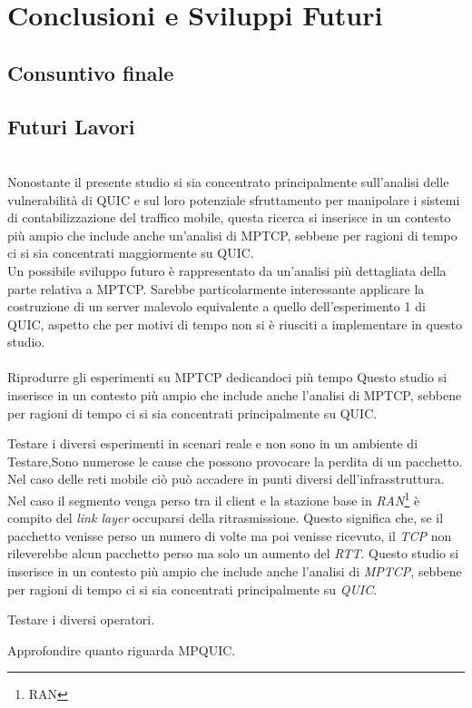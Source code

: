 \chapter{Conclusioni e Sviluppi Futuri}
\label{cap:conclusioni}

\section{Consuntivo finale}

\section{Futuri Lavori}
~\\
\indent Nonostante il presente studio si sia concentrato principalmente sull'analisi delle vulnerabilità di QUIC e sul loro potenziale sfruttamento per manipolare i sistemi di contabilizzazione del traffico mobile, questa ricerca si inserisce in un contesto più ampio che include anche un'analisi di MPTCP, sebbene per ragioni di tempo ci si sia concentrati maggiormente su QUIC.
\\
Un possibile sviluppo futuro è rappresentato da un'analisi più dettagliata della parte relativa a MPTCP. Sarebbe particolarmente interessante applicare la costruzione di un server malevolo equivalente a quello dell'esperimento 1 di QUIC, aspetto che per motivi di tempo non si è riusciti a implementare in questo studio.
\\\\

Riprodurre gli esperimenti su MPTCP dedicandoci più tempo Questo studio si inserisce in un contesto più ampio che include anche l’analisi di
MPTCP, sebbene per ragioni di tempo ci si sia concentrati principalmente su QUIC.

Testare i diversi esperimenti in scenari reale e non sono in un ambiente di Testare,Sono numerose le cause che possono provocare la perdita di un pacchetto. Nel caso delle reti mobile ciò può accadere in punti diversi dell'infrasstruttura. Nel caso il segmento venga perso tra il client e la stazione base in \emph{RAN}\footnote{\gls{RAN}} è compito del \emph{link layer} occuparsi della ritrasmissione. Questo significa che, se il pacchetto venisse perso un numero di volte ma poi venisse ricevuto, il \emph{TCP} non rileverebbe alcun pacchetto perso ma solo un aumento del \emph{RTT}.
Questo studio si inserisce in un contesto più ampio che include anche l'analisi di \emph{MPTCP}, sebbene per ragioni di tempo ci si sia concentrati principalmente su \emph{QUIC}. 

Testare i diversi operatori. 

Approfondire quanto riguarda MPQUIC.